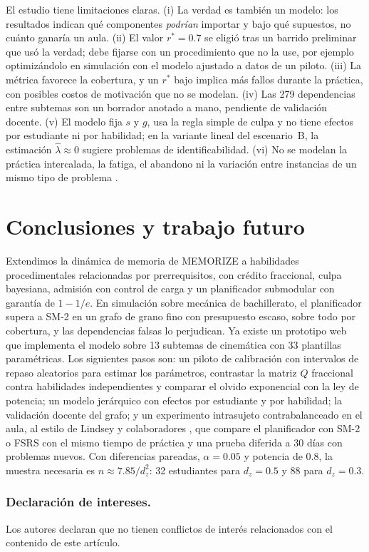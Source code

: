 \documentclass[runningheads]{llncs}
\renewcommand{\discintname}{Declaración de intereses.}%
\newcommand{\rstar}{r^{\ast}}
\begin{document}
El estudio tiene limitaciones claras. (i) La verdad es también un modelo: los resultados indican qué componentes \emph{podrían} importar y bajo qué supuestos, no cuánto ganaría un aula. (ii) El valor $\rstar=0.7$ se eligió tras un barrido preliminar que usó la verdad; debe fijarse con un procedimiento que no la use, por ejemplo optimizándolo en simulación con el modelo ajustado a datos de un piloto. (iii) La métrica favorece la cobertura, y un $\rstar$ bajo implica más fallos durante la práctica, con posibles costos de motivación que no se modelan. (iv) Las 279 dependencias entre subtemas son un borrador anotado a mano, pendiente de validación docente. (v) El modelo fija $s$ y $g$, usa la regla simple de culpa y no tiene efectos por estudiante ni por habilidad; en la variante lineal del escenario~B, la estimación $\hat\lambda\approx0$ sugiere problemas de identificabilidad. (vi) No se modelan la práctica intercalada, la fatiga, el abandono ni la variación entre instancias de un mismo tipo de problema \cite{rohrer2015}.

\section{Conclusiones y trabajo futuro}

Extendimos la dinámica de memoria de MEMORIZE a habilidades procedimentales relacionadas por prerrequisitos, con crédito fraccional, culpa bayesiana, admisión con control de carga y un planificador submodular con garantía de $1-1/e$. En simulación sobre mecánica de bachillerato, el planificador supera a SM-2 en un grafo de grano fino con presupuesto escaso, sobre todo por cobertura, y las dependencias falsas lo perjudican. Ya existe un prototipo web que implementa el modelo sobre 13 subtemas de cinemática con 33 plantillas paramétricas. Los siguientes pasos son: un piloto de calibración con intervalos de repaso aleatorios para estimar los parámetros, contrastar la matriz $Q$ fraccional contra habilidades independientes y comparar el olvido exponencial con la ley de potencia; un modelo jerárquico con efectos por estudiante y por habilidad; la validación docente del grafo; y un experimento intrasujeto contrabalanceado en el aula, al estilo de Lindsey y colaboradores \cite{lindsey2014}, que compare el planificador con SM-2 o FSRS con el mismo tiempo de práctica y una prueba diferida a 30 días con problemas nuevos. Con diferencias pareadas, $\alpha=0.05$ y potencia de 0.8, la muestra necesaria es $n\approx7.85/d_z^2$: 32 estudiantes para $d_z=0.5$ y 88 para $d_z=0.3$.

\begin{credits}
\subsubsection{\discintname}
Los autores declaran que no tienen conflictos de interés relacionados con el contenido de este artículo.
\end{credits}



\end{document}
